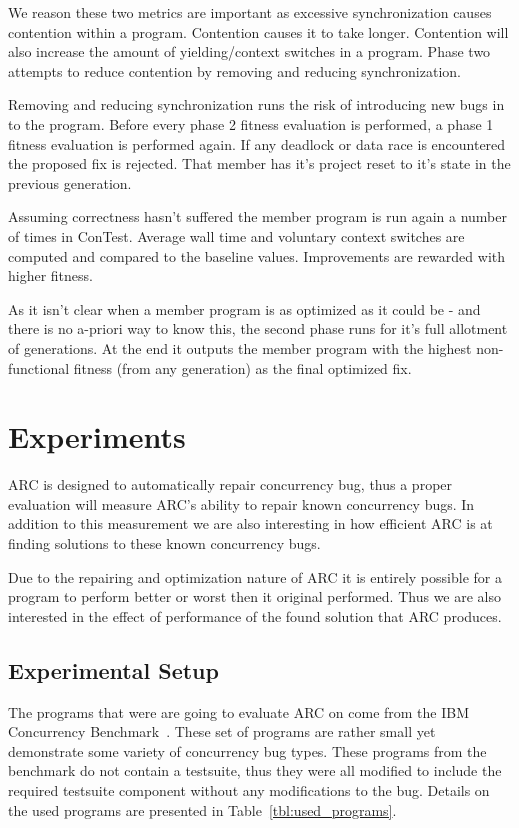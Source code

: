 \documentclass[10pt, conference, compsocconf]{IEEEtran}
\begin{document}
We reason these two metrics are important as excessive synchronization causes
contention within a program. Contention causes it to take longer. Contention
will also increase the amount of yielding/context switches in a program. Phase
two attempts to reduce contention by removing and reducing synchronization.

Removing and reducing synchronization runs the risk of introducing new bugs in
to the program. Before every phase 2 fitness evaluation is performed, a phase 1
fitness evaluation is performed again.  If any deadlock or data race is
encountered the proposed fix is rejected.  That member has it's project reset
to it's state in the previous generation.

Assuming correctness hasn't suffered the member program is run again a number
of times in ConTest.  Average wall time and voluntary context switches are
computed and compared to the baseline values.  Improvements are rewarded with
higher fitness.

As it isn't clear when a member program is as optimized as it could be - and
there is no a-priori way to know this, the second phase runs for it's full
allotment of generations.  At the end it outputs the member program with the
highest non-functional fitness (from any generation) as the final optimized
fix.

\section{Experiments}
\label{sec:experiments}

ARC is designed to automatically repair concurrency bug, thus a proper
evaluation will measure ARC's ability to repair known concurrency bugs. In
addition to this measurement we are also interesting in how efficient ARC is at
finding solutions to these known concurrency bugs.

Due to the repairing and optimization nature of ARC it is entirely possible for
a program to perform better or worst then it original performed. Thus we are
also interested in the effect of performance of the found solution that ARC
produces.

\subsection{Experimental Setup}
\label{sec:experimental_setup}

The programs that were are going to evaluate ARC on come from the IBM
Concurrency Benchmark~\cite{EHSU06}. These set of programs are rather small yet
demonstrate some variety of concurrency bug types. These programs from the
benchmark do not contain a testsuite, thus they were all modified to include
the required testsuite component without any modifications to the bug. Details
on the used programs are presented in Table~\ref{tbl:used_programs}.
\end{document}
